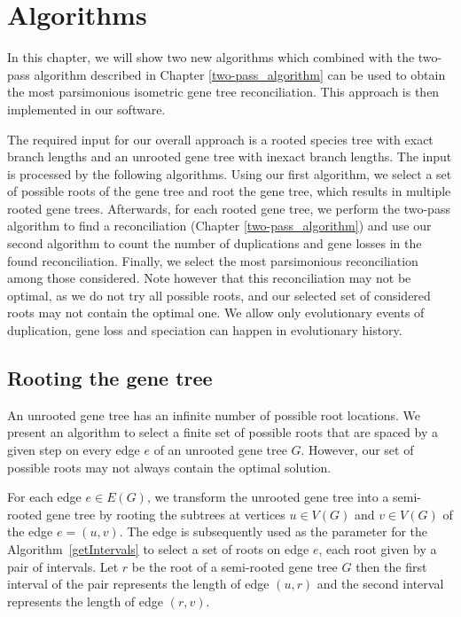 \chapter{Algorithms} \label{Algorithms}

In this chapter, we will show two new algorithms which combined with the two-pass algorithm described in Chapter \ref{two-pass_algorithm} \cite{chladek_thesis} can be used to obtain the most parsimonious isometric gene tree reconciliation. This approach is then implemented in our software.

The required input for our overall approach is a rooted species tree with exact branch lengths and an unrooted gene tree with inexact branch lengths. The input is processed by the following algorithms. Using our first algorithm, we select a set of possible roots of the gene tree and root the gene tree, which results in multiple rooted gene trees. Afterwards, for each rooted gene tree, we perform the two-pass algorithm to find a reconciliation  (Chapter \ref{two-pass_algorithm}) and use our second algorithm to count the number of duplications and gene losses in the found reconciliation. Finally, we select the most parsimonious reconciliation among those considered. Note however that this  reconciliation may not be optimal, as we do not try all possible roots, and our selected set of considered roots may not contain the optimal one. We allow only evolutionary events of duplication, gene loss and speciation can happen in evolutionary history.

\section{Rooting the gene tree} \label{rooting_the_gene_tree}

An unrooted gene tree has an infinite number of possible root locations. We present an algorithm to select a finite set of possible roots that are spaced by a given step on every edge $e$ of an unrooted gene tree $G$. However, our set of possible roots may not always contain the optimal solution. 

For each edge $e \in E(G)$, we transform the unrooted gene tree into a semi-rooted gene tree by rooting the subtrees at vertices $u \in V(G)$ and $v \in V(G)$ of the edge $e = (u, v)$. The edge is subsequently used as the parameter for the Algorithm~\ref{getIntervals} to select a set of roots on edge $e$, each root given by a pair of intervals. Let $r$ be the root of a semi-rooted gene tree $G$ then the first interval of the pair represents the length of edge $(u, r)$ and the second interval represents the length of edge $(r, v)$.


